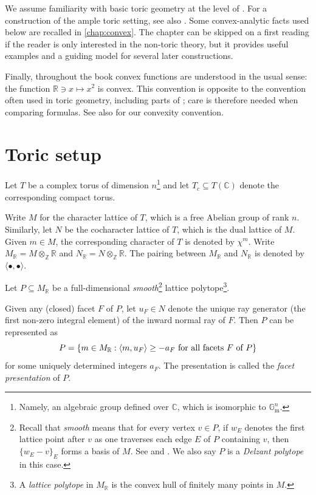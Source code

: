 We assume familiarity with basic toric geometry at the level of \cite{CLS11}. For a construction of the ample toric setting, see also \cite[Sections~18.7--18.9]{FPT}. Some convex-analytic facts used below are recalled in \cref{chap:convex}. The chapter can be skipped on a first reading if the reader is only interested in the non-toric theory, but it provides useful examples and a guiding model for several later constructions.

Finally, throughout the book convex functions are understood in the usual sense: the function $\mathbb R\ni x\mapsto x^2$ is convex. This convention is opposite to the convention often used in toric geometry, including parts of \cite{CLS11}; care is therefore needed when comparing formulas. See also \cite[Definition~18.1.1]{FPT} for our convexity convention.

\section{Toric setup}\label{sec:toricsetup}
Let $T$ be a complex torus of dimension $n$\footnote{Namely, an algebraic group defined over $\mathbb{C}$, which is isomorphic to $\mathbb{G}_{\mathrm{m}}^n$.} and let $T_c\subseteq T(\mathbb{C})$ denote the corresponding compact torus.

Write $M$ for the character lattice of $T$, which is a free Abelian group of rank $n$. Similarly, let $N$ be the cocharacter lattice of $T$, which is the dual lattice of $M$. Given $m\in M$, the corresponding character of $T$ is denoted by $\chi^m$.
Write $M_{\mathbb{R}}=M\otimes_{\mathbb{Z}} \mathbb{R}$ and $N_{\mathbb{R}}=N\otimes_{\mathbb{Z}}\mathbb{R}$. The pairing between $M_{\mathbb{R}}$ and $N_{\mathbb{R}}$ is denoted by $\langle \bullet,\bullet \rangle$.

Let $P\subseteq M_{\mathbb{R}}$ be a full-dimensional \emph{smooth}\footnote{Recall that \emph{smooth} means that for every vertex $v\in P$, if $w_E$ denotes the first lattice point after $v$ as one traverses each edge $E$ of $P$ containing $v$, then $\{w_E-v\}_E$ forms a basis of $M$. See \cite[Definition~2.4.2]{CLS11} and \cite[Definition~18.7.1]{FPT}. We also say $P$ is a \emph{Delzant polytope} in this case.} lattice polytope\footnote{A \emph{lattice polytope} in $M_{\mathbb{R}}$ is the convex hull of finitely many points in $M$.}.

Given any (closed) facet $F$ of $P$, let $u_F\in N$ denote the unique ray generator (the first non-zero integral element) of the inward normal ray of $F$. Then $P$ can be represented as
\begin{equation}\label{eq:Pfacetrep}
P=\left\{m\in M_{\mathbb{R}}: \langle m,u_F \rangle\geq -a_F\textup{ for all facets }F\textup{ of } P\right\}
\end{equation}
for some uniquely determined integers $a_F$. The presentation is called the \emph{facet presentation} of $P$.

